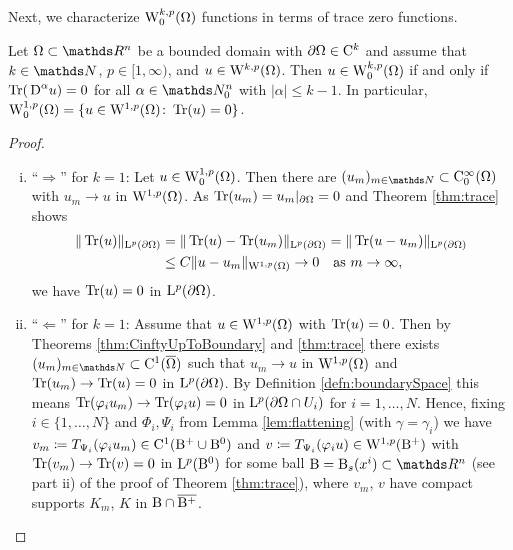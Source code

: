 Next, we characterize $\mathrm{W}_0^{k,p}(\Omega)$ functions in terms of trace zero functions.

\begin{thm}
  \label{thm:traceZeroFunctions}
  Let $\Omega \subset \R^n$ be a bounded domain with $\partial\Omega \in \mathrm{C}^k$ and assume that $k \in \N$, $p \in [ 1, \infty)$, and $u \in \mathrm{W}^{k,p}(\Omega)$.
    Then
    $
    u \in \mathrm{W}_0^{k,p}(\Omega)$ if and only if $\operatorname{Tr}(\,{\operatorname{D}}^\alpha u) = 0$ for all  $\alpha \in \N_0^n$ with $|\alpha| \leq k - 1$.
    In particular, $\mathrm{W}_0^{1,p}(\Omega) = \{ u \in \mathrm{W}^{1,p}(\Omega) \colon \operatorname{Tr}(u) = 0 \}$.
\end{thm}

\begin{proof}
  \begin{enumerate}[i)]
    \item ``$\Rightarrow$'' for $k = 1$:
      Let $u \in \mathrm{W}_0^{1,p}(\Omega)$.
      Then there are $(u_m)_{m \in \N} \subset \CC_0^\infty(\Omega)$ with $u_m \to u$ in $\mathrm{W}^{1,p}(\Omega)$.
      As $\operatorname{Tr}(u_m) = u_m|_{\partial\Omega} = 0$ and Theorem \ref{thm:trace} shows
      \begin{align*}
        \| \operatorname{Tr}(u) \|_{\mathrm{L}^p(\partial\Omega)}
        &= \|\operatorname{Tr}(u) - \operatorname{Tr}(u_m)\|_{\mathrm{L}^p(\partial\Omega)}
        = \| \operatorname{Tr}(u - u_m) \|_{\mathrm{L}^p(\partial\Omega)} \\
        &\leq C \|u - u_m\|_{\mathrm{W}^{1,p}(\Omega)} \to 0 \quad \text{as } m \to \infty,
      \end{align*}
      we have $\operatorname{Tr}(u) = 0$ in $\mathrm{L}^p(\partial\Omega)$.

    \item ``$\Leftarrow$'' for $k = 1$:
    Assume that $u \in \mathrm{W}^{1,p}(\Omega)$ with $\operatorname{Tr}(u) = 0$.
    Then by Theorems \ref{thm:CinftyUpToBoundary} and \ref{thm:trace} there exists $(u_m)_{m \in \N} \subset \CC^1(\overline\Omega)$ such that $u_m \to u$ in $\mathrm{W}^{1,p}(\Omega)$ and $\operatorname{Tr}(u_m) \to \operatorname{Tr}(u) = 0$ in $\mathrm{L}^p(\partial\Omega)$.
    By Definition \ref{defn:boundarySpace} this means $\operatorname{Tr}(\varphi_i u_m) \to \operatorname{Tr}(\varphi_i u) = 0$ in $\mathrm{L}^p(\partial\Omega \cap U_i)$ for $i = 1,\dots,N$.
    Hence, fixing $i \in \{1, \dots, N\}$ and $\Phi_i, \Psi_i$ from Lemma \ref{lem:flattening} (with $\gamma = \gamma_i$) we have $v_m \coloneqq T_{\Psi_i}(\varphi_i u_m) \in \mathrm{C}^1(\mathrm{B}^+ \cup \mathrm{B}^0)$ and $v \coloneqq T_{\Psi_i}(\varphi_i u) \in \mathrm{W}^{1,p}(\mathrm{B}^+)$ with $\operatorname{Tr}(v_m) \to \operatorname{Tr}(v) = 0$ in $\mathrm{L}^p(\mathrm{B}^0)$ for some ball $\BB = \BB_s(x^i) \subset \R^n$ (see part ii) of the proof of Theorem \ref{thm:trace}), where $v_m$, $v$ have compact supports $K_m$, $K$ in $\mathrm{B} \cap \overline{\mathrm{B}^+}$.


\end{enumerate}
\end{proof}
